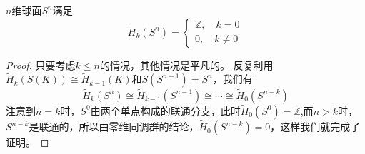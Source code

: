 \begin{lemma}
$n$维球面$S^{n}$满足
\begin{equation*}
    \tilde{H}_{k}(S^{n})=\left\{\begin{array}{c}
         \mathbb{Z},\quad k=0  \\
         0,\quad k\neq0
    \end{array}\right.
\end{equation*}
\end{lemma}
\begin{proof}
只要考虑$k\leq n$的情况，其他情况是平凡的。
反复利用$\tilde{H}_{k}(S(K))\cong \tilde{H}_{k-1}(K)$和$S(S^{n-1})=S^{n}$，我们有$$\tilde{H}_{k}(S^{n})\cong \tilde{H}_{k-1}(S^{n-1})\cong \cdots \cong \tilde{H}_{0}(S^{n-k})$$
注意到$n=k$时，$S^{0}$由两个单点构成的联通分支，此时$\tilde{H}_{0}(S^{0})=\mathbb{Z}$,而$n>k$时，$S^{n-k}$是联通的，所以由零维同调群的结论，$\tilde{H}_{0}(S^{n-k})=0$，这样我们就完成了证明。
\end{proof}